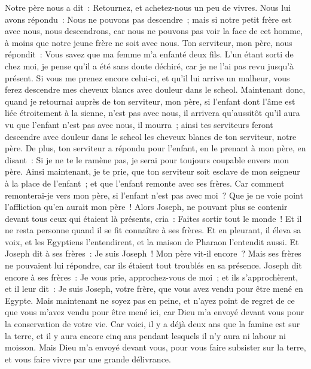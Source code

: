 \begin{multicols}{2}
Notre père nous a dit~: Retournez, et achetez-nous un peu de vivres.
Nous lui avons répondu~: Nous ne pouvons pas descendre~; mais si notre petit frère est avec nous, nous descendrons, car nous ne pouvons pas voir la face de cet homme, à moins que notre jeune frère ne soit avec nous.
Ton serviteur, mon père, nous répondit~: Vous savez que ma femme m'a enfanté deux fils.
L'un étant sorti de chez moi, je pense qu'il a été sans doute déchiré, car je ne l'ai pas revu jusqu'à présent.
Si vous me prenez encore celui-ci, et qu'il lui arrive un malheur, vous ferez descendre mes cheveux blancs avec douleur dans le scheol.
Maintenant donc, quand je retournai auprès de ton serviteur, mon père, si l'enfant dont l'âme est liée étroitement à la sienne, n'est pas avec nous,
il arrivera qu'aussitôt qu'il aura vu que l'enfant n'est pas avec nous, il mourra~; ainsi tes serviteurs feront descendre avec douleur dans le scheol les cheveux blancs de ton serviteur, notre père.
De plus, ton serviteur a répondu pour l'enfant, en le prenant à mon père, en disant~: Si je ne te le ramène pas, je serai pour toujours coupable envers mon père.
Ainsi maintenant, je te prie, que ton serviteur soit esclave de mon seigneur à la place de l'enfant~; et que l'enfant remonte avec ses frères.
Car comment remonterai-je vers mon père, si l'enfant n'est pas avec moi~? Que je ne voie point l'affliction qu'en aurait mon père~!
\VerseOne{}Alors Joseph, ne pouvant plus se contenir devant tous ceux qui étaient là présents, cria~: Faites sortir tout le monde~! Et il ne resta personne quand il se fit connaître à ses frères.
Et en pleurant, il éleva sa voix, et les Egyptiens l'entendirent, et la maison de Pharaon l'entendit aussi.
Et Joseph dit à ses frères~: Je suis Joseph~! Mon père vit-il encore~? Mais ses frères ne pouvaient lui répondre, car ils étaient tout troublés en sa présence.
Joseph dit encore à ses frères~: Je vous prie, approchez-vous de moi~; et ils s'approchèrent, et il leur dit~: Je suis Joseph, votre frère, que vous avez vendu pour être mené en Egypte.
Mais maintenant ne soyez pas en peine, et n'ayez point de regret de ce que vous m'avez vendu pour être mené ici, car Dieu m'a envoyé devant vous pour la conservation de votre vie.
Car voici, il y a déjà deux ans que la famine est sur la terre, et il y aura encore cinq ans pendant lesquels il n'y aura ni labour ni moisson.
Mais Dieu m'a envoyé devant vous, pour vous faire subsister sur la terre, et vous faire vivre par une grande délivrance.

\end{multicols}
